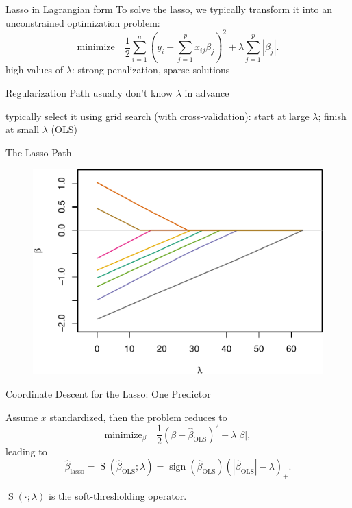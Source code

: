 \documentclass[10pt,ignorenonframetext]{beamer}
\DeclareMathOperator{\sign}{sign}
\begin{document}
\begin{frame}{Lasso in Lagrangian form}
To solve the lasso, we typically transform it into an \alert{unconstrained} optimization problem:
\[
\text{minimize} \quad \frac 12 \sum_{i=1}^n \left( y_i - \sum_{j=1}^p x_{ij}\beta_j \right)^2 + \lambda \sum_{j=1}^p |\beta_j|.
\]
high values of \(\lambda\): strong penalization, sparse solutions

\pause

\begin{block}{Regularization Path}
usually don't know \(\lambda\) in advance

\medskip

typically select it using \alert{grid search} (with cross-validation): start at large \(\lambda\); finish at small \(\lambda\) (OLS)

\end{block}
\end{frame}

\begin{frame}{The Lasso Path}
\begin{figure}
    \centering
    \includegraphics{figures/lasso-path.pdf}
\end{figure}
\end{frame}

\begin{frame}{Coordinate Descent for the Lasso: One Predictor}

Assume \(x\) standardized, then the problem reduces to 
\[
\text{minimize}_\beta \quad \frac 12 \left(\beta - \hat\beta_\mathrm{OLS}\right)^2 + \lambda |\beta|,
\]
leading to \[ \hat\beta_\mathrm{lasso} = \operatorname{S}(\hat\beta_\mathrm{OLS}; \lambda) = \sign(\hat\beta_\mathrm{OLS})\left(|\hat\beta_\mathrm{OLS}| - \lambda\right)_+.\]

\(\operatorname{S}(\cdot; \lambda)\) is the \alert{soft-thresholding} operator.

\begin{figure}
    \centering
    
\end{figure}

\end{frame}
\end{document}
